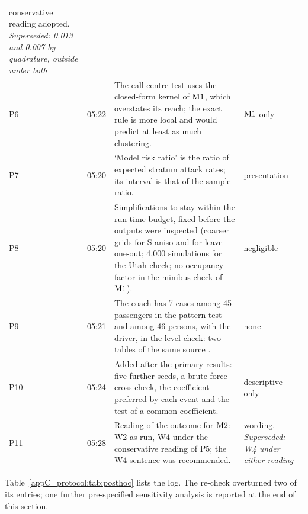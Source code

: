 \begin{table}[tbp]
\begin{tabular}{@{}ll>{\raggedright\arraybackslash}p{}>{\raggedright\arraybackslash}p{}@{}}
                 conservative reading adopted. \emph{Superseded: 0.013 and 0.007 by quadrature, outside under
                 both} \\
    P6 & 05:22 & The call-centre test uses the closed-form kernel of $\mathrm{M1}$, which overstates its reach; the
                 exact rule is more local and would predict at least as much clustering. & $\mathrm{M1}$ only \\
    P7 & 05:20 & `Model risk ratio' is the ratio of expected stratum attack rates; its interval is that of
                 the sample ratio. & presentation \\
    P8 & 05:20 & Simplifications to stay within the run-time budget, fixed before the outputs were inspected
                 (coarser grids for S-aniso and for leave-one-out; 4{,}000 simulations for the Utah check; no
                 occupancy factor in the minibus check of $\mathrm{M1}$). & negligible \\
    P9 & 05:21 & The coach has 7 cases among 45 passengers in the pattern test and among 46 persons, with the
                 driver, in the level check: two tables of the same source \citep{ou2022}. & none \\
    P10 & 05:24 & Added after the primary results: five further seeds, a brute-force cross-check, the
                 coefficient preferred by each event and the test of a common coefficient. &
                 descriptive only \\
    P11 & 05:28 & Reading of the outcome for $\mathrm{M2}$: W2 as run, W4 under the conservative reading of P5; the
                 W4 sentence was recommended. & wording. \emph{Superseded: W4 under either reading} \\
    \bottomrule
  \end{tabular}
\end{table}

Table~\ref{appC_protocol:tab:posthoc} lists the log. The re-check overturned two of its entries; one further
pre-specified sensitivity analysis is reported at the end of this section.

